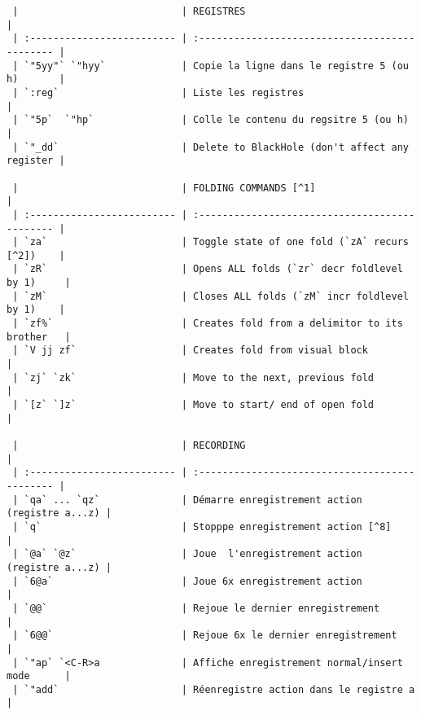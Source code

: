 \documentclass[10pt,landscape]{article}
\begin{document}
\begin{multicols}{2}
\begin{verbatim}
 |                            | REGISTRES                                      |
 | :------------------------- | :--------------------------------------------- |
 | `"5yy"` `"hyy`             | Copie la ligne dans le registre 5 (ou h)       |
 | `:reg`                     | Liste les registres                            |
 | `"5p`  `"hp`               | Colle le contenu du regsitre 5 (ou h)          |
 | `"_dd`                     | Delete to BlackHole (don't affect any register |

 |                            | FOLDING COMMANDS [^1]                          |
 | :------------------------- | :--------------------------------------------- |
 | `za`                       | Toggle state of one fold (`zA` recurs [^2])    |
 | `zR`                       | Opens ALL folds (`zr` decr foldlevel by 1)     |
 | `zM`                       | Closes ALL folds (`zM` incr foldlevel by 1)    |
 | `zf%`                      | Creates fold from a delimitor to its brother   |
 | `V jj zf`                  | Creates fold from visual block                 |
 | `zj` `zk`                  | Move to the next, previous fold                |
 | `[z` `]z`                  | Move to start/ end of open fold                |

 |                            | RECORDING                                      |
 | :------------------------- | :--------------------------------------------- |
 | `qa` ... `qz`              | Démarre enregistrement action (registre a...z) |
 | `q`                        | Stopppe enregistrement action [^8]             |
 | `@a` `@z`                  | Joue  l'enregistrement action (registre a...z) |
 | `6@a`                      | Joue 6x enregistrement action                  |
 | `@@`                       | Rejoue le dernier enregistrement               |
 | `6@@`                      | Rejoue 6x le dernier enregistrement            |
 | `"ap` `<C-R>a              | Affiche enregistrement normal/insert mode      |
 | `"add`                     | Réenregistre action dans le registre a         |




\end{verbatim}
\end{multicols}
\end{document}
